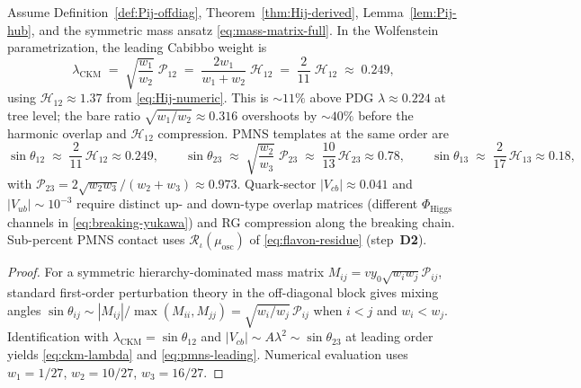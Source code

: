 \begin{proposition}
\label{prop:ckm-hierarchy}
Assume Definition~\ref{def:Pij-offdiag}, Theorem~\ref{thm:Hij-derived},
Lemma~\ref{lem:Pij-hub}, and the symmetric mass ansatz \eqref{eq:mass-matrix-full}.
In the Wolfenstein parametrization, the leading Cabibbo weight is
\begin{equation}\label{eq:ckm-lambda}
  \lambda_{\mathrm{CKM}}
  \;=\;
  \sqrt{\frac{w_1}{w_2}}\;\mathcal{P}_{12}
  \;=\;
  \frac{2w_1}{w_1+w_2}\;\mathcal{H}_{12}
  \;=\;
  \frac{2}{11}\;\mathcal{H}_{12}
  \;\approx\;
  0.249,
\end{equation}
using $\mathcal{H}_{12}\approx 1.37$ from \eqref{eq:Hij-numeric}. This is
$\sim11\%$ above PDG $\lambda\approx0.224$ at tree level; the bare ratio
$\sqrt{w_1/w_2}\approx0.316$ overshoots by $\sim40\%$ before the harmonic
overlap and $\mathcal{H}_{12}$ compression. PMNS templates at the same order
are
\begin{equation}\label{eq:pmns-leading}
  \sin\theta_{12}
  \;\approx\;
  \frac{2}{11}\,\mathcal{H}_{12}\approx 0.249,
  \qquad
  \sin\theta_{23}
  \;\approx\;
  \sqrt{\frac{w_2}{w_3}}\;\mathcal{P}_{23}
  \;\approx\;
  \frac{10}{13}\,\mathcal{H}_{23}\approx 0.78,
  \qquad
  \sin\theta_{13}
  \;\approx\;
  \frac{2}{17}\,\mathcal{H}_{13}\approx 0.18,
\end{equation}
with $\mathcal{P}_{23}=2\sqrt{w_2w_3}/(w_2+w_3)\approx0.973$. Quark-sector
$|V_{cb}|\approx0.041$ and $|V_{ub}|\sim10^{-3}$ require distinct up- and
down-type overlap matrices (different $\Phi_{\mathrm{Higgs}}$ channels in
\eqref{eq:breaking-yukawa}) and RG compression along the breaking chain.
Sub-percent PMNS contact uses $\mathcal{R}_\iota(\mu_{\mathrm{osc}})$ of
\eqref{eq:flavon-residue} (step~\textbf{D2}).
\end{proposition}

\begin{proof}
For a symmetric hierarchy-dominated mass matrix
$M_{ij}=v y_0\sqrt{w_iw_j}\mathcal{P}_{ij}$, standard first-order perturbation
theory in the off-diagonal block gives mixing angles
$\sin\theta_{ij}\sim|M_{ij}|/\max(M_{ii},M_{jj})
=\sqrt{w_i/w_j}\,\mathcal{P}_{ij}$ when $i<j$ and $w_i<w_j$.
Identification with $\lambda_{\mathrm{CKM}}=\sin\theta_{12}$ and
$|V_{cb}|\sim A\lambda^2\sim\sin\theta_{23}$ at leading order yields
\eqref{eq:ckm-lambda} and \eqref{eq:pmns-leading}. Numerical evaluation uses
$w_1=1/27$, $w_2=10/27$, $w_3=16/27$.
\end{proof}

